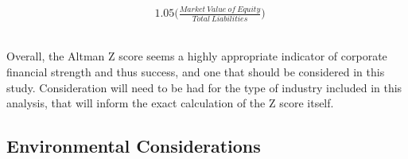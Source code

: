 {\begin {equation}
\begin{aligned}
		& 1.05\bigg({\frac{Market \ Value \ of \ Equity}{Total \ Liabilities}}\bigg) \ \\\\ 
\end{aligned}
\end{equation}\\
Overall, the Altman Z score seems a highly appropriate indicator of corporate financial strength and thus success, and one that should be considered in this study. Consideration will need to be had for the type of industry included in this analysis, that will inform the exact calculation of the Z score itself. }
\subsection{Environmental Considerations}\label{EnvironmentalConsiderations}
